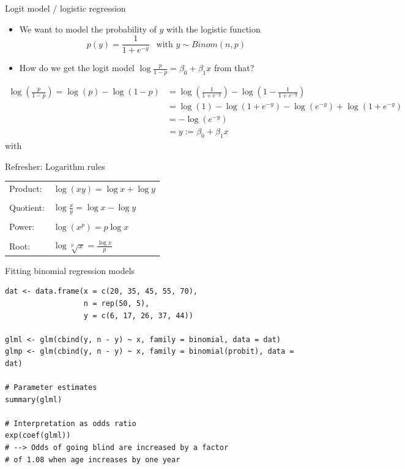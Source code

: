 \documentclass[aspectratio=169]{beamer}
\begin{document}
\begin{frame}{Logit model / logistic regression}
  \begin{itemize}
    \item We want to model the probability of $y$ with the logistic
      function
  \begin{equation*}
    p(y) = \frac{1}{1 + e^{-y}}~~\text{  with } y \sim Binom(n, p)
  \end{equation*}
    \item How do we get the logit model $\log\frac{p}{1 - p} =
      \beta_0 + \beta_1 x$ from that?
  \end{itemize}\pause
      \begin{align*}
        \log\left(\frac{p}{1 - p}\right) = \log(p) - \log(1-p) 
        & = \log\left(\frac{1}{1 + e^{-y}}\right) - \log\left(1 - \frac{1}{1 + e^{-y}}\right) \\
        & = \log(1) - \log(1 + e^{-y}) - \log(e^{-y}) + \log(1 + e^{-y}) \\
        & = -\log(e^{-y})\\
        & = y := \beta_0 + \beta_1 x
      \end{align*}
     with 
\end{frame}

\begin{frame}{Refresher: Logarithm rules}

\begin{tabular}{p{2cm}l}
  Product:  & $\log(xy)=\log x+\log y$ \\
  &\\
  Quotient: & $\log\!{\frac {x}{y}}=\log x-\log y$ \\
  &\\
  Power:    & $\log\left(x^{p}\right)=p\log x$ \\
  &\\
  Root:     & $\log{\sqrt[{p}]{x}}={\frac {\log x}{p}}$ \\
\end{tabular}

\end{frame}

\begin{frame}[fragile]{Fitting binomial regression models}
\begin{lstlisting}
dat <- data.frame(x = c(20, 35, 45, 55, 70),
                  n = rep(50, 5),
                  y = c(6, 17, 26, 37, 44))

glml <- glm(cbind(y, n - y) ~ x, family = binomial, data = dat)
glmp <- glm(cbind(y, n - y) ~ x, family = binomial(probit), data = dat)

# Parameter estimates
summary(glml)

# Interpretation as odds ratio
exp(coef(glml))
# --> Odds of going blind are increased by a factor
# of 1.08 when age increases by one year
\end{lstlisting}
\end{frame}
\end{document}
